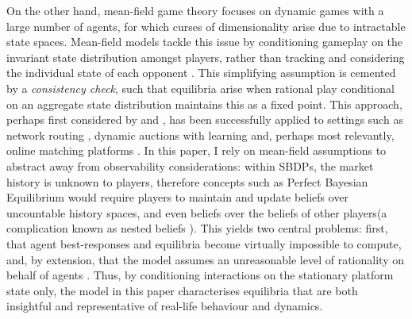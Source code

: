On the other hand, mean-field game theory focuses on dynamic games with a large number of agents, for which curses of dimensionality arise due to intractable state spaces. 
Mean-field models tackle this issue by conditioning gameplay on the invariant state distribution amongst players, rather than tracking and considering the individual state of each opponent \citep{light2022mean}.
This simplifying assumption is cemented by a \textit{consistency check}, such that equilibria arise when rational play conditional on an aggregate state distribution maintains this as a fixed point. 
This approach, perhaps first considered by \cite{jovanovic1988anonymous} and \cite{hopenhayn1992entry}, has been successfully applied to settings such as network routing \citep{calderone2017markov}, dynamic auctions with learning \citep{iyer2014mean} and, perhaps most relevantly, online matching platforms \citep{kanoria2021facilitating,immorlica2021designing}.
In this paper, I rely on mean-field assumptions to abstract away from observability considerations: within SBDPs, the market history is unknown to players, therefore concepts such as Perfect Bayesian Equilibrium would require players to maintain and update beliefs over uncountable history spaces, and even beliefs over the beliefs of other players(a complication known as nested beliefs \citep{brandenburger1993hierarchies}).
This yields two central problems: first, that agent best-responses and equilibria become virtually impossible to compute, and, by extension, that the model assumes an unreasonable level of rationality on behalf of agents \citep{iyer2014mean}.
Thus, by conditioning interactions on the stationary platform state only, the model in this paper characterises equilibria that are both insightful and representative of real-life behaviour and dynamics. 

